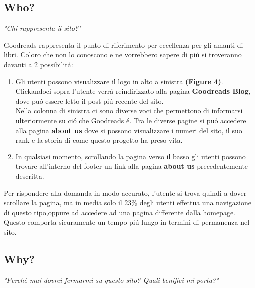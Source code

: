\documentclass[12pt]{article}
\begin{document}
\subsection{Who?}
\begin{center}
{\large \textit{"Chi rappresenta il sito?"}}
\end{center}

\noindent Goodreads rappresenta il punto di riferimento per eccellenza per gli amanti di libri. Coloro che non lo conoscono e ne vorrebbero sapere di pi\'u si troveranno davanti a 2 possibilit\'a:

\begin{enumerate}
	\item Gli utenti possono visualizzare il logo in alto a sinistra \textbf{(Figure 4)}. Clickandoci sopra l'utente verr\'a reindirizzato alla pagina \textbf{Goodreads Blog}, dove pu\'o essere letto il post pi\'u recente del sito. \\
	Nella colonna di sinistra ci sono diverse voci che permettono di informarsi ulteriormente su ci\'o che Goodreads \'e. Tra le diverse pagine si pu\'o accedere alla pagina \textbf{about us} dove si possono visualizzare i numeri del sito, il suo rank e la storia di come questo progetto ha preso vita.
	
	\item In qualsiasi momento, scrollando la pagina verso il basso gli utenti possono trovare all'interno del footer un link alla pagina \textbf{about us} precedentemente descritta.

\end{enumerate}

\noindent Per rispondere alla domanda in modo accurato, l'utente si trova quindi a dover scrollare la pagina, ma in media solo il 23\% degli utenti effettua una navigazione di questo tipo,oppure ad accedere ad una pagina differente dalla homepage. Questo comporta sicuramente un tempo pi\'u lungo in termini di permanenza nel sito. 



\subsection{Why?}
\begin{center}
{\large \textit{"Perch\'e mai dovrei fermarmi su questo sito? Quali benifici mi porta?"}}
\end{center}
\end{document}
